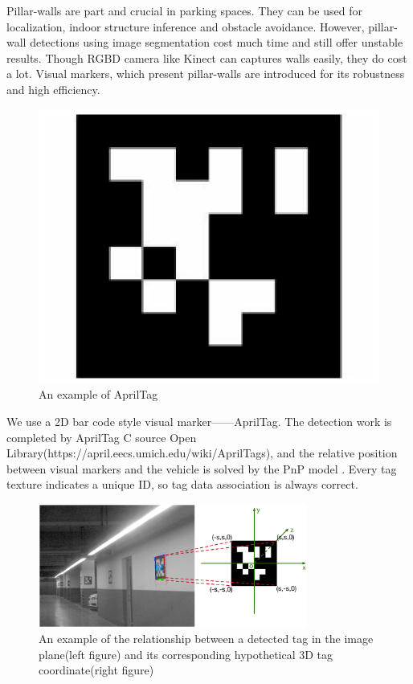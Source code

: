 \documentclass[journal]{IEEEtran}
\begin{document}
Pillar-walls are part and crucial in parking spaces. 
They can be used for localization, indoor structure inference and obstacle avoidance. 
However, pillar-wall detections using image segmentation cost much time and still offer unstable results. 
Though RGBD camera like Kinect can captures walls easily, they do cost a lot. 
Visual markers, which present pillar-walls are introduced for its robustness and high efficiency.


\begin{figure}
\centering
\includegraphics{pic/fig6_Visual_markers}
\caption{An example of AprilTag}\label{fig:6}
\end{figure}

We use a 2D bar code style visual marker——AprilTag. 
The detection work is completed by AprilTag C source Open Library(https://april.eecs.umich.edu/wiki/AprilTags)\cite{Olson2011AprilTag}, and the relative position between visual markers and the vehicle is solved by the PnP model \cite{Hartley2003Multiple}. 
Every tag texture indicates a unique ID, so tag data association is always correct.

\begin{figure}
\centering
\includegraphics[height = 1.6in]{pic/fig7_Visual_markers}
\caption{
An example of the relationship between a detected tag in the image plane(left figure) and its corresponding hypothetical 3D tag coordinate(right figure)
}\label{fig:7}
\end{figure}
\end{document}
